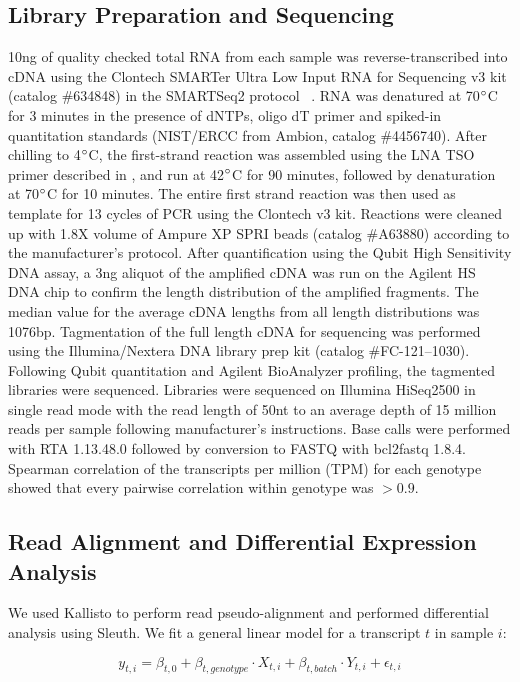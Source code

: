 \subsection*{Library Preparation and Sequencing}
10ng of quality checked total RNA from each sample was
reverse-transcribed into cDNA using the Clontech SMARTer Ultra Low Input RNA for
Sequencing v3 kit (catalog \#634848) in the SMARTSeq2 protocol
~\citep{Picelli2014}.  RNA was denatured at 70$\degree{}$C for 3 minutes
in the presence of dNTPs, oligo dT primer and spiked-in quantitation standards
(NIST/ERCC from Ambion, catalog \#4456740).  After chilling to 4$\degree{}$C, the
first-strand reaction was assembled using the LNA TSO primer described in
\citet{Picelli2014}, and run at 42$\degree{}$C for 90 minutes, followed by
denaturation at 70$\degree{}$C for 10 minutes.  The entire first strand reaction
was then used as template for 13 cycles of PCR using the Clontech v3 kit.
Reactions were cleaned up with 1.8X volume of Ampure XP SPRI beads (catalog
\#A63880) according to the manufacturer’s protocol.  After quantification using
the Qubit High Sensitivity DNA assay, a 3ng aliquot of the amplified cDNA was
run on the Agilent HS DNA chip to confirm the length distribution of the
amplified fragments.  The median value for the average cDNA lengths from all
length distributions was 1076bp.  Tagmentation of the full length cDNA for
sequencing was performed using the Illumina/Nextera DNA library prep kit (catalog
\#FC-121--1030).  Following Qubit quantitation and Agilent BioAnalyzer profiling,
the tagmented libraries were sequenced. Libraries were sequenced on Illumina
HiSeq2500 in single read mode with the read length of 50nt to an average depth
of 15 million reads per sample following manufacturer's instructions. Base calls
were performed with RTA 1.13.48.0 followed by conversion to FASTQ with bcl2fastq
1.8.4. Spearman correlation of the transcripts per million (TPM) for each
genotype showed that every pairwise correlation within genotype was $>0.9$.

\subsection*{Read Alignment and Differential Expression Analysis}
We used Kallisto to perform read pseudo-alignment and performed differential
analysis using Sleuth. We fit a general linear model for a transcript $t$ in
sample $i$:

\begin{equation}
  y_{t,i} = \beta_{t, 0} + \beta_{t, genotype}\cdot{}X_{t, i} +
  \beta_{t, batch}\cdot{}Y_{t, i} + \epsilon_{t, i}
\end{equation}

